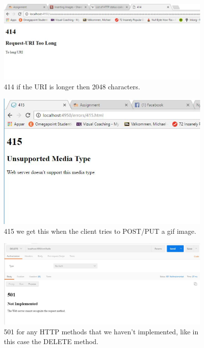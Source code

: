 \documentclass[a4paper,12pt]{article}
\numberwithin{figure}{section}
\begin{document}
\begin{figure}[h!]
	\centering
	\label{414}
	\includegraphics[width=0.95\textwidth,keepaspectratio]{img/414.jpg} 
	\caption{414 if the URI is longer then 2048 characters.}
\end{figure}

\begin{figure}[h!]
	\centering
	\label{415}
	\includegraphics[width=0.95\textwidth,keepaspectratio]{img/415.jpg} 
	\caption{415 we get this when the client tries to POST/PUT a gif image. }
\end{figure}

\begin{figure}[h!]
	\centering
	\label{501}
	\includegraphics[width=0.95\textwidth,keepaspectratio]{img/501.jpg} 
	\caption{501 for any HTTP methods that we haven't implemented, like in this case the DELETE method.}
\end{figure}
\end{document}
